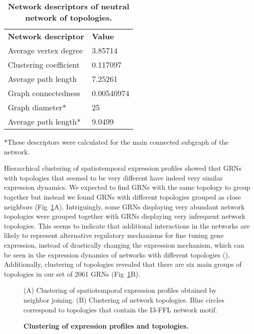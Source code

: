 \documentclass[10pt,letterpaper]{article}
\newlength\savedwidth
\newcommand\thickhline{\noalign{\global\savedwidth\arrayrulewidth\global\arrayrulewidth 2pt}%
\hline
\noalign{\global\arrayrulewidth\savedwidth}}
\begin{document}
\begin{table}[!ht]
 \centering
 \caption{{\bf Network descriptors of neutral network of topologies.}}
 \begin{tabular}{|l|l|}
 \hline
 {\bf Network descriptor} & {\bf Value}\\ \thickhline
 Average vertex degree  & 3.85714 \\ \hline
 Clustering coefficient~\cite{Watts1998} & 0.117097 \\ \hline
 Average path length    & 7.25261       \\ \hline
 Graph connectedness    & 0.00540974    \\ \hline
 Graph diameter*        & 25            \\ \hline
 Average path length*   & 9.0499        \\ \hline
 \end{tabular}
 \begin{flushleft} *These descriptors were calculated for the main connected
 subgraph of the network.
 \end{flushleft}
 \label{table1}
 \end{table}

Hierarchical clustering of spatiotemporal expression profiles showed that GRNs
with topologies that seemed to be very different have indeed very similar
expression dynamics. We expected to find GRNs with the same topology to group
together but instead we found GRNs with different topologies grouped as close
neighbors (Fig~\ref{fig:clustering}A). Intriguingly, some GRNs displaying
very abundant network topologies were grouped together with GRNs displaying
very infrequent network topologies. This seems to indicate that additional
interactions in the networks are likely to represent alternative regulatory
mechanisms for fine tuning gene expression, instead of drastically changing
the expression mechanism, which can be seen in the expression dynamics of
networks with different topologies (). Additionally, clustering
of topologies revealed that there are six main groups of topologies in our set
of 2061 GRNs (Fig~\ref{fig:clustering}B).

\begin{figure}[!h]
 \caption{\bf Clustering of expression profiles and topologies.}
 (A) Clustering of spatiotemporal expression profiles obtained by
 neighbor joining. (B) Clustering of network topologies. Blue circles
 correspond to topologies that contain the I3-FFL network motif.
 \label{fig:clustering}
\end{figure}
\end{document}
